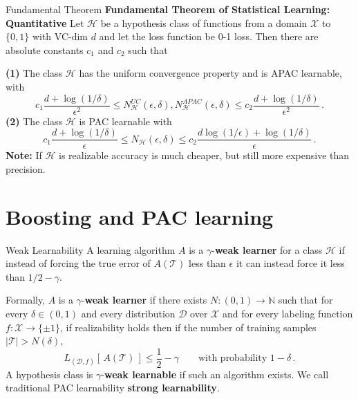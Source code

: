\documentclass[10pt, table, dvipsnames, handout]{beamer}
\newcommand{\cT}{\ensuremath{\mathcal{T}}}
\newcommand{\cD}{\ensuremath{\mathcal{D}}}
\newcommand{\cX}{\ensuremath{\mathcal{X}}}
\newcommand{\cH}{\ensuremath{\mathcal{H}}}
\newcommand{\bN}{\ensuremath{\mathbb{N}}}
\begin{document}
\begin{frame}[fragile]{Fundamental Theorem}
\textbf{Fundamental Theorem of Statistical Learning: Quantitative} Let $\cH$ be a hypothesis class of functions from a domain $\cX$ to $\{0,1\}$ with VC-dim $d$ and let the loss function be 0-1 loss. \pause Then there are absolute constants $c_1$ and $c_2$ such that

\textbf{(1)} The class $\cH$ has the uniform convergence property and is APAC learnable, with
$$
c_1 \frac{d + \log (1/\delta)}{\epsilon^2} \leq N^{UC}_\cH(\epsilon,\delta), N^{APAC}_\cH(\epsilon,\delta) \leq c_2 \frac{d + \log (1/\delta)}{\epsilon^2}\,.
$$\pause
\textbf{(2)} The class $\cH$ is PAC learnable with 
$$
c_1 \frac{d + \log (1/\delta)}{\epsilon} \leq N_\cH(\epsilon,\delta) \leq c_2 \frac{d \log(1/\epsilon)+ \log (1/\delta)}{\epsilon}\,.
$$\pause
\textbf{Note:} If $\cH$ is realizable accuracy is much cheaper, but still more expensive than precision. 
\end{frame}




\section{Boosting and PAC learning}





\begin{frame}[fragile]{Weak Learnability}
A learning algorithm $A$ is a $\gamma$-\textbf{weak learner} for a class $\cH$ if instead of forcing the true error of $A(\cT)$ less than $\epsilon$ it can instead force it less than $1/2-\gamma$. \pause 

Formally, $A$ is a $\gamma$-\textbf{weak learner} if  there exists $N:(0,1)\to \bN$ such that for every $\delta \in (0,1)$ and every distribution $\cD$ over $\cX$ and for every labeling function $f:\cX\to\{\pm 1\}$, if realizability holds then if the number of training samples $|\cT|>N(\delta)$, 
$$
L_{(\cD,f)}[\,A(\cT)\,]\leq \frac12 - \gamma \hspace{2em} \text{with probability } 1-\delta\,.
$$\pause
A hypothesis class is $\gamma$-\textbf{weak learnable} if such an algorithm exists. We call traditional PAC learnability \textbf{strong learnability}.
\end{frame}
\end{document}
